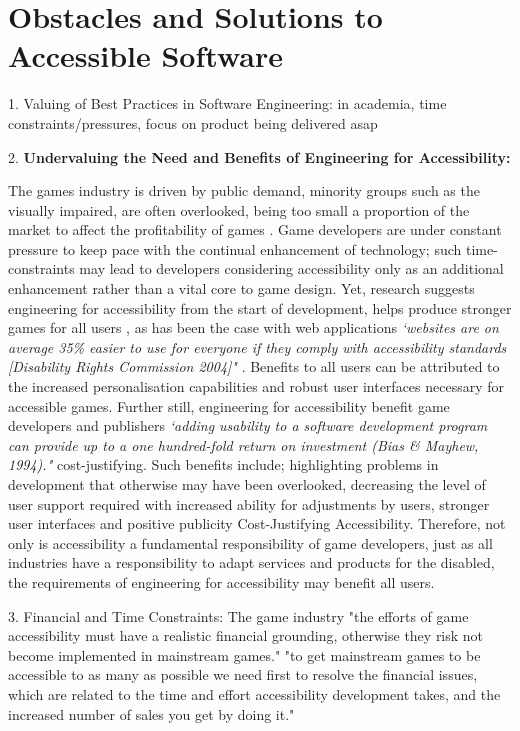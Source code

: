 \documentclass{scrartcl}
\begin{document}
\section{Obstacles and Solutions to Accessible Software}

1.	Valuing of Best Practices in Software Engineering: in academia, time constraints/pressures, focus on product being delivered asap


2. \textbf{Undervaluing the Need and Benefits of Engineering for Accessibility:}  

The games industry is driven by public demand, minority groups such as the visually impaired, are often overlooked, being too small a proportion of the market to affect the profitability of games \cite{16}. Game developers are under constant pressure to keep pace with the continual enhancement of technology; such time-constraints may lead to developers considering accessibility only as an additional enhancement rather than a vital core to game design. 
Yet, research suggests engineering for accessibility from the start of development, helps produce stronger games for all users {}{}, as has been the case with web applications \textit{`websites are on average 35\% easier to use for everyone if they comply with accessibility standards [Disability Rights Commission 2004]"} \cite{5}. Benefits to all users can be attributed to the increased personalisation capabilities and robust user interfaces necessary for accessible games. 
Further still, engineering for accessibility benefit game developers and publishers \textit{`adding usability to a software development program can provide up to a one hundred-fold return on investment (Bias \& Mayhew, 1994)."} {cost-justifying}. Such benefits include; highlighting problems in development that otherwise may have been overlooked, decreasing the level of user support required with increased ability for adjustments by users, stronger user interfaces and positive publicity {Cost-Justifying Accessibility}. Therefore, not only is accessibility a fundamental responsibility of game developers, just as all industries have a responsibility to adapt services and products for the disabled, the requirements of engineering for accessibility may benefit all users. 


3.	Financial and Time Constraints: 
The game industry "the efforts of game accessibility must have a realistic financial grounding, otherwise they risk not become implemented in mainstream games." "to get mainstream games to be accessible to as many as possible we need first to resolve the financial issues, which are related to the time and effort accessibility development takes, and the increased number of sales you get by doing it." \cite{14}
\end{document}
